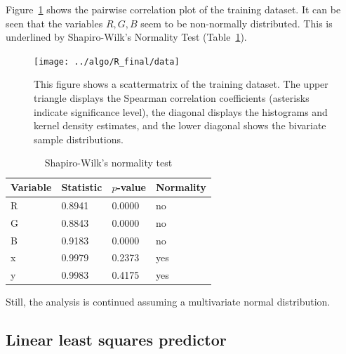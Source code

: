\documentclass{article}
\begin{document}
Figure~\ref{fig:pairwise} shows the pairwise correlation plot of the
training dataset. It can be seen that the variables $R, G, B$ seem to
be non-normally distributed. This is underlined by Shapiro-Wilk's
Normality Test (Table~\ref{tab:shapiro}).
\begin{figure}[h]
  \centering
  \texttt{[image: ../algo/R\_final/data]}
  \caption{This figure shows a scattermatrix of the training
    dataset. The upper triangle displays the Spearman correlation
    coefficients (asterisks indicate significance level), the diagonal
    displays the histograms and kernel density estimates, and the
    lower diagonal shows the bivariate sample distributions.}
  \label{fig:pairwise}
\end{figure}
\begin{table}[h]
  \centering
  \begin{tabular}{llll}
    \toprule
    Variable & Statistic & $p$-value & Normality \\
    \midrule
    R        & 0.8941    & 0.0000  & no        \\
    G        & 0.8843    & 0.0000  & no        \\
    B        & 0.9183    & 0.0000  & no        \\
    x        & 0.9979    & 0.2373  & yes       \\
    y        & 0.9983    & 0.4175  & yes       \\
    \bottomrule
  \end{tabular}
  \caption{Shapiro-Wilk's normality test}
  \label{tab:shapiro}
\end{table}
Still, the analysis is continued assuming a multivariate normal
distribution.

\subsection{Linear least squares predictor}


\end{document}
